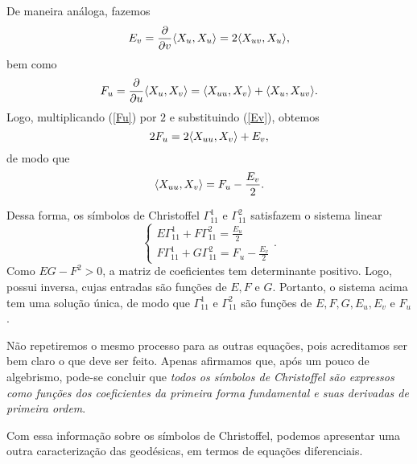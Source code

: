 De maneira análoga, fazemos
\begin{equation}
    E_{ v }
    = \frac{ \partial }{ \partial v } \langle X_{ u }, X_{ u } \rangle
    = 2 \langle X_{ uv }, X_{ u } \rangle
    \label{Ev}
,\end{equation}
bem como
\begin{equation}
    F_{ u }
    = \frac{ \partial }{ \partial u } \langle X_{ u }, X_{ v } \rangle
    = \langle X_{ uu }, X_{ v } \rangle + \langle X_{ u }, X_{ uv } \rangle
    \label{Fu}
.\end{equation}
Logo, multiplicando (\ref{Fu}) por \( 2 \) e substituindo (\ref{Ev}), obtemos
\begin{equation*}
    2 F_{ u } = 2 \langle X_{ uu }, X_{ v } \rangle + E_{ v }
,\end{equation*}
de modo que
\begin{equation*}
    \langle X_{ uu }, X_{ v } \rangle = F_{ u } - \frac{ E_{ v } }{ 2 }
.\end{equation*}

Dessa forma, os símbolos de Christoffel \( \Gamma_{ 11 }^{ 1 } \) e \( \Gamma_{ 11 }^{ 2 } \) satisfazem o sistema linear
\begin{equation*}
    \begin{cases}
        E \Gamma_{ 11 }^{ 1 } + F \Gamma_{ 11 }^{ 2 } = \frac{ E_{ u } }{ 2 } \\
        F \Gamma_{ 11 }^{ 1 } + G \Gamma_{ 11 }^{ 2 } = F_{ u } - \frac{ E_{ v } }{ 2 }
    \end{cases}
.\end{equation*}
Como \( EG - F^2 > 0 \), a matriz de coeficientes tem determinante positivo.
Logo, possui inversa, cujas entradas são funções de \( E, F \) e \( G \).
Portanto, o sistema acima tem uma solução única, de modo que \( \Gamma_{ 11 }^{ 1 } \) e \( \Gamma_{ 11 }^{ 2 } \) são funções de \( E, F, G, E_{ u }, E_{ v } \) e \( F_{ u } \).

Não repetiremos o mesmo processo para as outras equações, pois acreditamos ser bem claro o que deve ser feito.
Apenas afirmamos que, após um pouco de algebrismo, pode-se concluir que \emph{todos os símbolos de Christoffel são expressos como funções dos coeficientes da primeira forma fundamental e suas derivadas de primeira ordem}.

Com essa informação sobre os símbolos de Christoffel, podemos apresentar uma outra caracterização das geodésicas, em termos de equações diferenciais.

